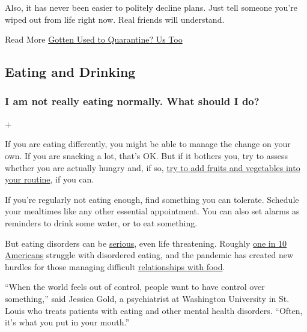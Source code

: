 Also, it has never been easier to politely decline plans. Just tell
someone you're wiped out from life right now. Real friends will
understand.

 Read More
\href{https://www.nytimes3xbfgragh.onion/2020/06/27/at-home/manage-your-coronavirus-anxiety.html}{Gotten
Used to Quarantine? Us Too}

\hypertarget{eating-and-drinking}{%
\subsection{Eating and Drinking}\label{eating-and-drinking}}

\hypertarget{i-am-not-really-eating-normally-what-should-i-do}{%
\subsubsection{I am not really eating normally. What should I
do?}\label{i-am-not-really-eating-normally-what-should-i-do}}

+

If you are eating differently, you might be able to manage the change on
your own. If you are snacking a lot, that's OK. But if it bothers you,
try to assess whether you are actually hungry and, if so,
\href{https://www.nytimes3xbfgragh.onion/2020/04/20/well/eat/coronavirus-diet-metabolic-health.html}{try
to add fruits and vegetables into your routine}, if you can.

If you're regularly not eating enough, find something you can tolerate.
Schedule your mealtimes like any other essential appointment. You can
also set alarms as reminders to drink some water, or to eat something.

But eating disorders can be
\href{https://www.nytimes3xbfgragh.onion/2020/05/03/sports/athletes-eating-disorders.html}{serious},
even life threatening. Roughly
\href{http://eatingdisorderscoalition.org.s208556.gridserver.com/couch/uploads/file/Eating\%20Disorders\%20Fact\%20Sheet.pdf}{one
in 10 Americans} struggle with disordered eating, and the pandemic has
created new hurdles for those managing difficult
\href{https://www.nytimes3xbfgragh.onion/2020/05/12/well/mind/i-have-an-eating-disorder-but-cant-escape-the-kitchen.html}{relationships
with food}.

``When the world feels out of control, people want to have control over
something,'' said Jessica Gold, a psychiatrist at Washington University
in St. Louis who treats patients with eating and other mental health
disorders. ``Often, it's what you put in your mouth.''

